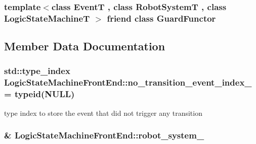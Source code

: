 \hypertarget{classLogicStateMachineFrontEnd_a9411581bb37b54467df520e3c73ceaf0}{
\subsubsection[{Guard\-Functor}]{\setlength{\rightskip}{0pt plus 5cm}template$<$class Event\-T , class Robot\-System\-T , class Logic\-State\-Machine\-T $>$ friend class {\bf Guard\-Functor}\hspace{0.3cm}{\ttfamily [friend]}}}\label{classLogicStateMachineFrontEnd_a9411581bb37b54467df520e3c73ceaf0}


\subsection{Member Data Documentation}
\hypertarget{classLogicStateMachineFrontEnd_a0f19247a261344e58dede909f598677f}{
\subsubsection[{no\-\_\-transition\-\_\-event\-\_\-index\-\_\-}]{\setlength{\rightskip}{0pt plus 5cm}std\-::type\-\_\-index Logic\-State\-Machine\-Front\-End\-::no\-\_\-transition\-\_\-event\-\_\-index\-\_\- = typeid(N\-U\-L\-L)\hspace{0.3cm}{\ttfamily [protected]}}}\label{classLogicStateMachineFrontEnd_a0f19247a261344e58dede909f598677f}


type index to store the event that did not trigger any transition 

\hypertarget{classLogicStateMachineFrontEnd_a8431e5208e24b80105d639281361a252}{
\subsubsection[{robot\-\_\-system\-\_\-}]{\& Logic\-State\-Machine\-Front\-End\-::robot\-\_\-system\-\_\-\hspace{0.3cm}{\ttfamily [protected]}}}\label{classLogicStateMachineFrontEnd_a8431e5208e24b80105d639281361a252}


